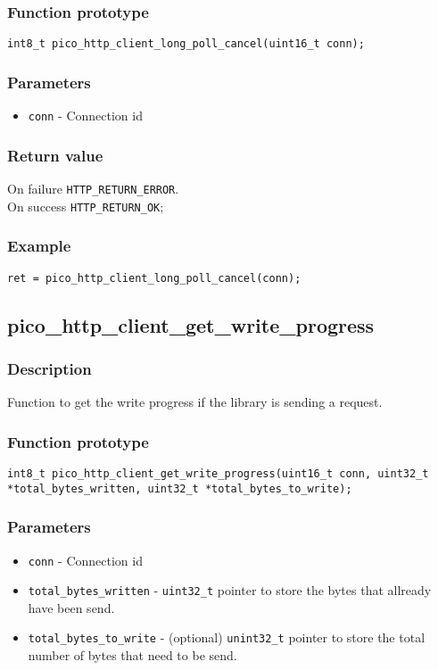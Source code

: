 \subsubsection*{Function prototype}
\texttt{int8\_t pico\_http\_client\_long\_poll\_cancel(uint16\_t conn);}

\subsubsection*{Parameters}
\begin{itemize}[noitemsep]
\item \texttt{conn} - Connection id
\end{itemize}
\subsubsection*{Return value}
On failure \texttt{HTTP\_RETURN\_ERROR}.
\\On success \texttt{HTTP\_RETURN\_OK};
\subsubsection*{Example}
\begin{verbatim}
ret = pico_http_client_long_poll_cancel(conn);
\end{verbatim}


\subsection{pico\_http\_client\_get\_write\_progress}

\subsubsection*{Description}
Function to get the write progress if the library is sending a request.

\subsubsection*{Function prototype}
\texttt{int8\_t pico\_http\_client\_get\_write\_progress(uint16\_t conn, uint32\_t *total\_bytes\_written, uint32\_t *total\_bytes\_to\_write);}

\subsubsection*{Parameters}
\begin{itemize}[noitemsep]
\item \texttt{conn} - Connection id
\item \texttt{total\_bytes\_written} - \texttt{uint32\_t} pointer to store the bytes that allready have been send.
\item \texttt{total\_bytes\_to\_write} - (optional) \texttt{unint32\_t} pointer to store the total number of bytes that need to be send.
\end{itemize}
